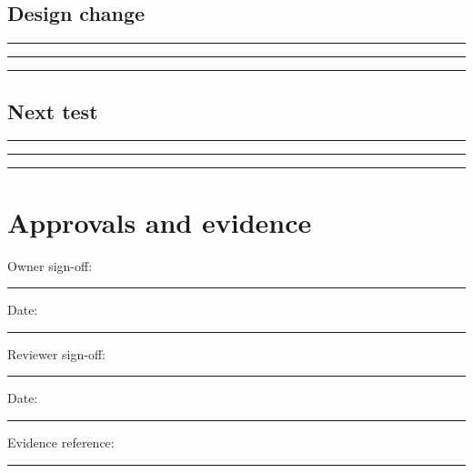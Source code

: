 \documentclass[11pt]{article}
\begin{document}
\subsection{Design change}
\noindent\rule{\linewidth}{0.3pt}\par\vspace{0.18in}
\noindent\rule{\linewidth}{0.3pt}\par\vspace{0.18in}
\noindent\rule{\linewidth}{0.3pt}\par\vspace{0.14in}

\subsection{Next test}
\noindent\rule{\linewidth}{0.3pt}\par\vspace{0.18in}
\noindent\rule{\linewidth}{0.3pt}\par\vspace{0.18in}
\noindent\rule{\linewidth}{0.3pt}\par\vspace{0.14in}

\section{Approvals and evidence}
\noindent Owner sign-off: \rule{0.42\linewidth}{0.4pt}\hfill Date: \rule{0.19\linewidth}{0.4pt}\par\vspace{0.4cm}
\noindent Reviewer sign-off: \rule{0.40\linewidth}{0.4pt}\hfill Date: \rule{0.19\linewidth}{0.4pt}\par\vspace{0.4cm}
\noindent Evidence reference: \rule{0.70\linewidth}{0.4pt}
\end{document}
